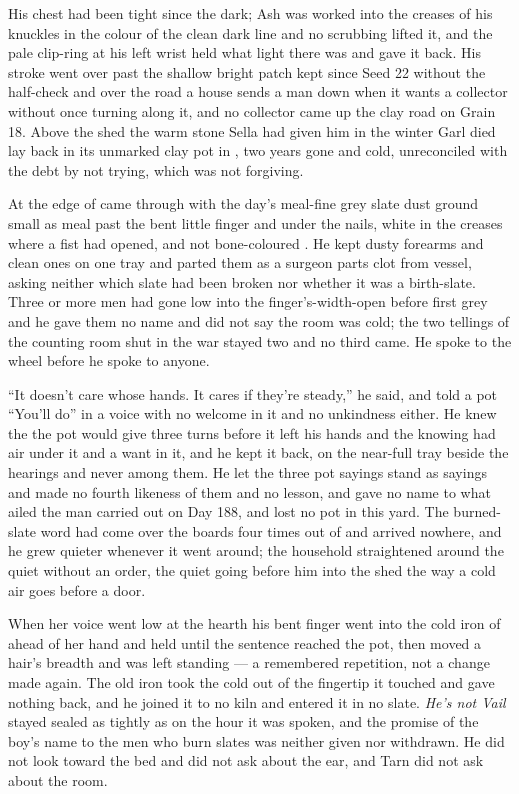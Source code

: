 His chest had been tight since the dark; Ash was worked into the creases of his knuckles in the colour of the clean dark line and no scrubbing lifted it, and the pale clip-ring at his left wrist held what light there was and gave it back. His stroke went over  past the shallow bright patch kept since Seed 22 without the half-check and over the road a house sends a man down when it wants a collector without once turning along it, and no collector came up the clay road on Grain 18. Above the shed the warm stone Sella had given him in the winter Garl died lay back in its unmarked clay pot in , two years gone and cold, unreconciled with the debt by not trying, which was not forgiving.

\scenebreak

At the edge of   came through with the day's meal-fine grey slate dust ground small as meal past the bent little finger and under the nails, white in the creases where a fist had opened, and not bone-coloured . He kept dusty forearms and clean ones on one tray and parted them as a surgeon parts clot from vessel, asking neither which slate had been broken nor whether it was a birth-slate. Three or more men had gone low into the finger's-width-open  before first grey and he gave them no name and did not say the room was cold; the two tellings of the counting room shut in the war stayed two and no third came. He spoke to the wheel before he spoke to anyone.

“It doesn't care whose hands. It cares if they're steady,” he said, and told a pot “You'll do” in a voice with no welcome in it and no unkindness either. He knew the  the pot would give three turns before it left his hands and the knowing had air under it and a want in it, and he kept it back, on the near-full tray beside the hearings and never among them. He let the three pot sayings stand as sayings and made no fourth likeness of them and no lesson, and gave no name to what ailed the man carried out on Day 188, and lost no pot in this yard. The burned-slate word had come over the boards four times out of  and arrived nowhere, and he grew quieter whenever it went around; the household straightened around the quiet without an order, the quiet going before him into the shed the way a cold air goes before a door.

When her voice went low at the hearth his bent finger went into the cold iron of  ahead of her hand and held until the sentence reached the pot, then moved a hair's breadth and was left standing --- a remembered repetition, not a change made again. The old iron took the cold out of the fingertip it touched and gave nothing back, and he joined it to no kiln and entered it in no slate. \emph{He's not Vail} stayed sealed as tightly as on the hour it was spoken, and the promise of the boy's name to the men who burn slates was neither given nor withdrawn. He did not look toward the bed and did not ask about the ear, and Tarn did not ask about the room.

